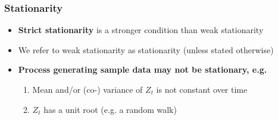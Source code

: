 \documentclass{beamer}
\begin{document}
				
				\begin{frame}
					
					\frametitle{Stationarity}
					\normalsize
				\begin{itemize}
				\item[] \textbf{Strict stationarity} is a stronger condition than weak stationarity
				\vspace{18pt}\pause
				\item[] We refer to weak stationarity as stationarity (unless stated otherwise)
				\vspace{18pt}\pause
				
				\item[]\textbf{Process generating sample data may not be stationary, e.g.}
				\pause\vspace{5pt}
				\begin{enumerate}\normalsize
					\item[]\hspace{10pt} Mean	 and/or (co-) variance of $Z_t$ is not constant over time
					\pause\hspace{10pt} 
					\item[]\hspace{10pt}  $Z_t$ has a unit root (e.g. a random walk)
					
				\end{enumerate}
				\end{itemize}

			
			
		\end{frame}
		
\end{document}
